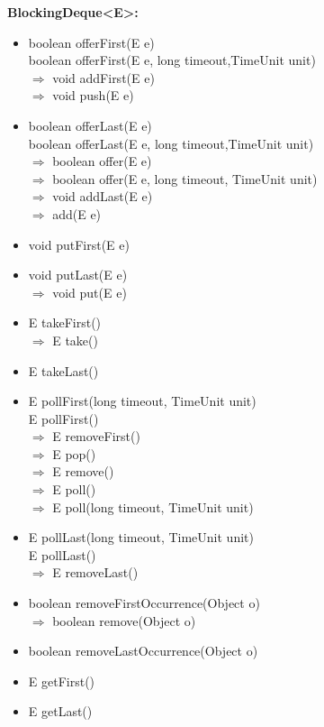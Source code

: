 \documentclass[]{usiinfthesis}
\begin{document}
{\noindent
\textbf{BlockingDeque<E>:}
\begin{itemize}
    \item boolean offerFirst(E e)
    \mbox{}\\ boolean offerFirst(E e, long timeout,TimeUnit unit)
    \mbox{}\\ $\Rightarrow$   void addFirst(E e)
    \mbox{}\\ $\Rightarrow$   void push(E e)
    \item boolean offerLast(E e) 
    \mbox{}\\boolean offerLast(E e, long timeout,TimeUnit unit)
    \mbox{}\\ $\Rightarrow$   boolean offer(E e)
    \mbox{}\\ $\Rightarrow$   boolean offer(E e, long timeout, TimeUnit unit)
    \mbox{}\\ $\Rightarrow$   void addLast(E e)
    \mbox{}\\ $\Rightarrow$   add(E e)
    \item void putFirst(E e)
    \item void putLast(E e)
    \mbox{}\\ $\Rightarrow$   void put(E e)
    \item E takeFirst()
    \mbox{}\\ $\Rightarrow$   E take()
    \item E takeLast() 
    \item E pollFirst(long timeout, TimeUnit unit)
    \mbox{}\\ E pollFirst()
        \mbox{}\\ $\Rightarrow$   E removeFirst()
        \mbox{}\\ $\Rightarrow$   E pop()
        \mbox{}\\ $\Rightarrow$   E remove()
        \mbox{}\\ $\Rightarrow$   E poll()
        \mbox{}\\ $\Rightarrow$   E poll(long timeout, TimeUnit unit)
    \item E pollLast(long timeout, TimeUnit unit)
        \mbox{}\\ E pollLast()
        \mbox{}\\ $\Rightarrow$   E removeLast()
    \item boolean removeFirstOccurrence(Object o)
    \mbox{}\\ $\Rightarrow$   boolean remove(Object o)
    \item boolean removeLastOccurrence(Object o)
        \item E getFirst()
        \item E getLast()
\end{itemize}

}
\end{document}

